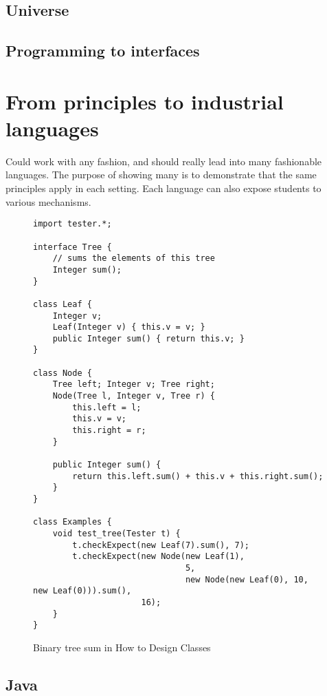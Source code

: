 \documentclass[submission,copyright]{eptcs}
\begin{document}
\subsection{Universe}

\subsection{Programming to interfaces}








\section{From principles to industrial languages}
\label{sec:industrial}

Could work with any fashion, and should really lead into many
fashionable languages.  The purpose of showing many is to demonstrate
that the same principles apply in each setting.  Each language can also
expose students to various mechanisms.

\begin{figure}
\begin{verbatim}
import tester.*;

interface Tree {
    // sums the elements of this tree
    Integer sum();
}

class Leaf {
    Integer v;
    Leaf(Integer v) { this.v = v; }
    public Integer sum() { return this.v; }
}

class Node {
    Tree left; Integer v; Tree right;
    Node(Tree l, Integer v, Tree r) {
        this.left = l;
        this.v = v;
        this.right = r;
    }

    public Integer sum() {
        return this.left.sum() + this.v + this.right.sum();
    }
}

class Examples {
    void test_tree(Tester t) {
        t.checkExpect(new Leaf(7).sum(), 7);
        t.checkExpect(new Node(new Leaf(1),
                               5, 
                               new Node(new Leaf(0), 10, new Leaf(0))).sum(),
                      16);
    }
}
\end{verbatim}
\caption{Binary tree sum in How to Design Classes}
\end{figure}


\subsection{Java}
\end{document}
